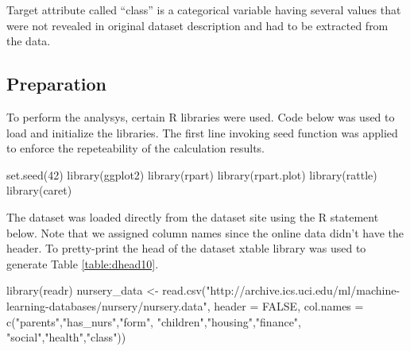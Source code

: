 Target attribute called ``class'' is a categorical variable having
several values that were not revealed in original dataset description
and had to be extracted from the data.

\hypertarget{preparation}{%
\subsection{Preparation}\label{preparation}}

To perform the analysys, certain R libraries were used. Code below was
used to load and initialize the libraries. The first line invoking seed
function was applied to enforce the repeteability of the calculation
results.

\begin{Schunk}
\begin{Sinput}
set.seed(42)
library(ggplot2)
library(rpart)
library(rpart.plot)
library(rattle)
library(caret)
\end{Sinput}
\end{Schunk}

The dataset was loaded directly from the dataset site
\citep{noauthor_uci_nodate} using the R statement below. Note that we
assigned column names since the online data didn't have the header. To
pretty-print the head of the dataset xtable \citep{R-xtable} library was
used to generate Table \ref{table:dhead10}.

\begin{Schunk}
\begin{Sinput}
library(readr)
nursery_data <- 
  read.csv("http://archive.ics.uci.edu/ml/machine-learning-databases/nursery/nursery.data", 
  header = FALSE, 
  col.names = c("parents","has_nurs","form", "children","housing","finance",
                "social","health","class"))
\end{Sinput}
\end{Schunk}

